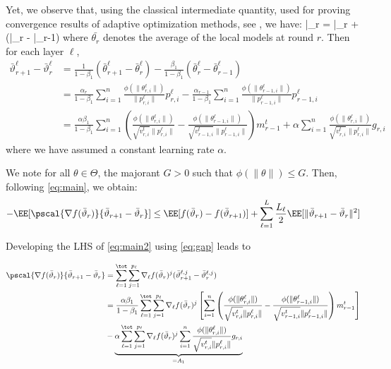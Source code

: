 \documentclass{article}
\begin{document}
Yet, we observe that, using the classical intermediate quantity, used for proving convergence results of adaptive optimization methods, see \citep{}, we have:
\beq
\bar{\vartheta}_r = \bar{\theta}_r +  (\bar{\theta}_{r} - \bar{\theta}_{r-1})
\eeq
where $\bar{\theta_r}$ denotes the average of the local models at round $r$.
Then for each layer $\ell$,
\begin{align}\label{eq:gap}
\bar{\vartheta}^\ell_{r+1} - \bar{\vartheta}^\ell_r  & = \frac{1}{1-\beta_1}(\bar{\theta}^\ell_{r+1} - \bar{\theta}^\ell_{r}) - \frac{\beta_1}{1-\beta_1}(\bar{\theta}^\ell_{r} - \bar{\theta}^\ell_{r-1})\\
& = \frac{\alpha_{r}}{1-\beta_1} \sum_{i = 1}^n \frac{\phi(\|\theta_{r,i}^{\ell}\|)}{\|p_{r,i}^{\ell}\|} p_{r,i}^{\ell}  - \frac{\alpha_{r-1}}{1-\beta_1}\sum_{i = 1}^n \frac{\phi(\|\theta_{r-1,i}^{\ell}\|)}{\|p_{r-1,i}^{\ell}\|} p_{r-1,i}^{\ell}\\
& = \frac{\alpha \beta_1}{1-\beta_1}  \sum_{i = 1}^n  \left( \frac{\phi(\|\theta_{r,i}^{\ell}\|)}{\sqrt{v^{t}_{r,i}} \|p_{r,i}^{\ell}\|} - \frac{\phi(\|\theta_{r-1,i}^{\ell}\|)}{\sqrt{v^{t}_{r-1,i}} \|p_{r-1,i}^{\ell}\|} \right) m^{t}_{r-1} + \alpha \sum_{i = 1}^n \frac{\phi(\|\theta_{r,i}^{\ell}\|)}{\sqrt{v^{t}_{r,i}} \|p_{r,i}^{\ell}\|} g_{r,i}
\end{align}
where we have assumed a constant learning rate $\alpha$.


We note for all $\theta \in \Theta$, the majorant $G > 0$ such that $\phi(\|\theta \|) \leq G$. Then, following \eqref{eq:main}, we obtain:
\begin{align}\label{eq:main2}
- \EE[  \pscal{\nabla f(\bar{\vartheta}_r)}{\bar{\vartheta}_{r+1} - \bar{\vartheta}_r}]  \leq  \EE[ f(\bar{\vartheta}_r) - f(\bar{\vartheta}_{r+1})] + \sum_{\ell =1}^L \frac{L_\ell}{2} \EE[  \| \bar{\vartheta}_{r+1} - \bar{\vartheta}_r \|^2]
\end{align}

Developing the LHS of \eqref{eq:main2} using \eqref{eq:gap} leads to

\begin{align}
\pscal{\nabla f(\bar{\vartheta}_r)}{\bar{\vartheta}_{r+1} - \bar{\vartheta}_r} &= \sum_{\ell=1}^\tot \sum_{j=1}^{p_\ell} \nabla_{\ell} f(\bar{\vartheta}_r)^j (\bar{\vartheta}^{\ell,j}_{r+1} - \bar{\vartheta}^{\ell,j}_r) \\
& =  \frac{\alpha \beta_1}{1-\beta_1}  \sum_{\ell=1}^\tot \sum_{j=1}^{p_\ell} \nabla_{\ell} f(\bar{\vartheta}_r)^j \left[   \sum_{i = 1}^n  \left( \frac{\phi(\|\theta_{r,i}^{\ell}\|)}{\sqrt{v^{t}_{r,i}} \|p_{r,i}^{\ell}\|} - \frac{\phi(\|\theta_{r-1,i}^{\ell}\|)}{\sqrt{v^{t}_{r-1,i}} \|p_{r-1,i}^{\ell}\|} \right) m^{t}_{r-1}  \right] \\
& - \underbrace{ \alpha \sum_{\ell=1}^\tot \sum_{j=1}^{p_\ell} \nabla_{\ell} f(\bar{\vartheta}_r)^j  \sum_{i = 1}^n \frac{\phi(\|\theta_{r,i}^{\ell}\|)}{\sqrt{v^{t}_{r,i}} \|p_{r,i}^{\ell}\|} g_{r,i}}_{= A_1}
\end{align}
\end{document}
